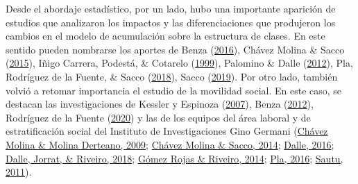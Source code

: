 \documentclass[
]{article}
\begin{document}
Desde el abordaje estadístico, por un lado, hubo una importante aparición de estudios que analizaron los impactos y las diferenciaciones que produjeron los cambios en el modelo de acumulación sobre la estructura de clases. En este sentido pueden nombrarse los aportes de Benza (\protect\hyperlink{ref-Benza2016}{2016}), Chávez Molina \& Sacco (\protect\hyperlink{ref-ChavezMolina2015}{2015}), Iñigo Carrera, Podestá, \& Cotarelo (\protect\hyperlink{ref-InigoCarrera1999}{1999}), Palomino \& Dalle (\protect\hyperlink{ref-Palomino.Dalle2012}{2012}), Pla, Rodríguez de la Fuente, \& Sacco (\protect\hyperlink{ref-Pla.etal2018}{2018}), Sacco (\protect\hyperlink{ref-Sacco2019}{2019}). Por otro lado, también volvió a retomar importancia el estudio de la movilidad social. En este caso, se destacan las investigaciones de Kessler y Espinoza (\protect\hyperlink{ref-Kessler2007}{2007}), Benza (\protect\hyperlink{ref-Benza2012}{2012}), Rodríguez de la Fuente (\protect\hyperlink{ref-RodriguezdelaFuente2020}{2020}) y las de los equipos del área laboral y de estratificación social del Instituto de Investigaciones Gino Germani (\protect\hyperlink{ref-ChavezMolina2009}{Chávez Molina \& Molina Derteano, 2009}; \protect\hyperlink{ref-ChavezMolina2014}{Chávez Molina \& Sacco, 2014}; \protect\hyperlink{ref-Dalle2016}{Dalle, 2016}; \protect\hyperlink{ref-Dalle.etal2018}{Dalle, Jorrat, \& Riveiro, 2018}; \protect\hyperlink{ref-GomezRojas.Riveiro2014}{Gómez Rojas \& Riveiro, 2014}; \protect\hyperlink{ref-Pla2016}{Pla, 2016}; \protect\hyperlink{ref-Sautu2011}{Sautu, 2011}).
\end{document}

